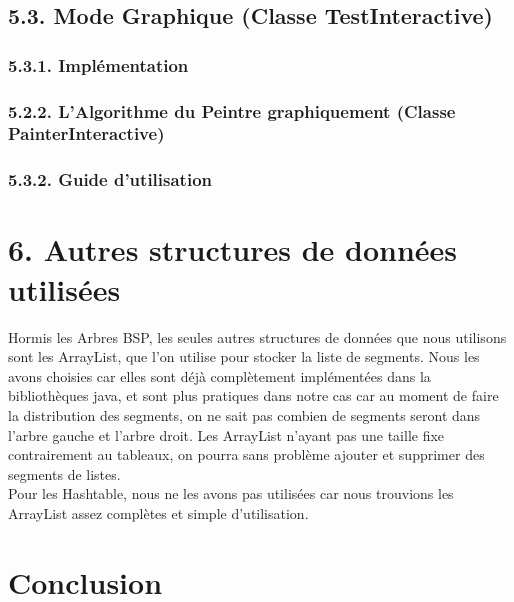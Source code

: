 \documentclass[a4paper,12pt]{report}	%
\begin{document}
	{\subsection*{5.3. Mode Graphique (Classe TestInteractive)}}
	
    {\subsubsection*{5.3.1. Implémentation}}
	
	   {\subsubsection*{5.2.2. L'Algorithme du Peintre graphiquement (Classe PainterInteractive)}}
	
    {\subsubsection*{5.3.2. Guide d'utilisation}}
	
	
	\newpage 
	{\section*{6. Autres structures de données utilisées}}
	Hormis les Arbres BSP, les seules autres structures de données que nous utilisons sont les ArrayList, que l'on utilise pour stocker la liste de segments. Nous les avons choisies car elles sont déjà complètement implémentées dans la bibliothèques java, et sont plus pratiques dans notre cas car au moment de faire la distribution des segments, on ne sait pas combien de segments seront dans l'arbre gauche et l'arbre droit. Les ArrayList n'ayant pas une taille fixe contrairement au tableaux, on pourra sans problème ajouter et supprimer des segments de listes.\\
	Pour les Hashtable, nous ne les avons pas utilisées car nous trouvions les ArrayList assez complètes et simple d'utilisation.\\
			
	{\section*{Conclusion}}
	
\end{document}
